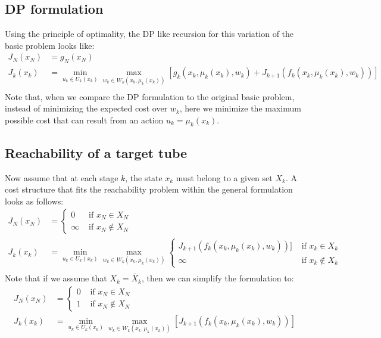 \documentclass[11pt, oneside]{article}   	%
\begin{document}
\subsection{DP formulation}
Using the principle of optimality, the DP like recursion for this variation of the basic problem looks like:
\begin{align*}
J_{N}(x_{N}) &= g_N(x_N)\\
J_{k}(x_{k}) &= \min_{u_k \in U_k(x_k)} \max_{w_k \in W_k(x_k,\mu_k(x_k))} \left[ g_k(x_k,\mu_k(x_k),w_k) + J_{k+1}(f_k(x_k,\mu_k(x_k),w_k))\right]\\
\end{align*}
Note that, when we compare the DP formulation to the original basic problem, instead of minimizing the expected cost over $w_k$, here we minimize the maximum possible cost that can result from an action $u_k=\mu_k(x_k)$.

\subsection{Reachability of a target tube}
Now assume that at each stage $k$, the state $x_k$ must belong to a given set $X_k$. A cost structure that fits the reachability problem within the general formulation looks as follows:
\begin{align*}
J_{N}(x_{N}) &= 
\begin{cases}
0 & \text{ if } x_N \in X_N\\
\infty & \text{ if } x_N \not\in X_N
\end{cases}\\
J_{k}(x_{k}) &= \min_{u_k \in U_k(x_k)} \max_{w_k \in W_k(x_k,\mu_k(x_k))} 
\begin{cases}
J_{k+1}(f_k(x_k,\mu_k(x_k),w_k))] & \text{ if } x_k \in X_k\\
\infty & \text{ if } x_k \not\in X_k
\end{cases}\\
\end{align*}
Note that if we assume that $X_k = \bar{X}_k$, then we can simplify the formulation to:
\begin{align*}
J_{N}(x_{N}) &= 
\begin{cases}
0 & \text{ if } x_N \in X_N\\
1 & \text{ if } x_N \not\in X_N
\end{cases}\\
J_{k}(x_{k}) &= \min_{u_k \in U_k(x_k)} \max_{w_k \in W_k(x_k,\mu_k(x_k))} \left[ J_{k+1}(f_k(x_k,\mu_k(x_k),w_k))\right]\\
\end{align*}
\end{document}
